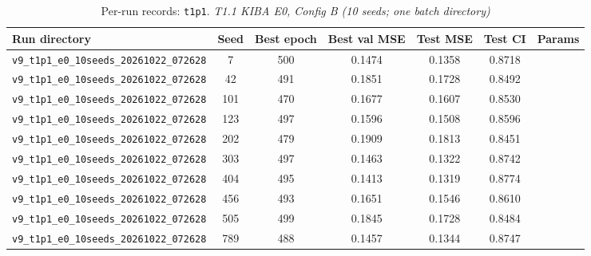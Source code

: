 \begin{table}[!h]
\centering\scriptsize
\caption{Per-run records: \texttt{t1p1}. \textit{T1.1 KIBA E0, Config B (10 seeds; one batch directory)}}
\label{tab:v9_runs_t1p1}
\begin{tabular}{p{4.8cm}cccccc}
\toprule
Run directory & Seed & Best epoch & Best val MSE & Test MSE & Test CI & Params \\
\midrule
\texttt{v9\_\allowbreak{}t1p1\_\allowbreak{}e0\_\allowbreak{}10seeds\_\allowbreak{}20261022\_\allowbreak{}072628} & 7 & 500 & 0.1474 & 0.1358 & 0.8718 &  \\
\texttt{v9\_\allowbreak{}t1p1\_\allowbreak{}e0\_\allowbreak{}10seeds\_\allowbreak{}20261022\_\allowbreak{}072628} & 42 & 491 & 0.1851 & 0.1728 & 0.8492 &  \\
\texttt{v9\_\allowbreak{}t1p1\_\allowbreak{}e0\_\allowbreak{}10seeds\_\allowbreak{}20261022\_\allowbreak{}072628} & 101 & 470 & 0.1677 & 0.1607 & 0.8530 &  \\
\texttt{v9\_\allowbreak{}t1p1\_\allowbreak{}e0\_\allowbreak{}10seeds\_\allowbreak{}20261022\_\allowbreak{}072628} & 123 & 497 & 0.1596 & 0.1508 & 0.8596 &  \\
\texttt{v9\_\allowbreak{}t1p1\_\allowbreak{}e0\_\allowbreak{}10seeds\_\allowbreak{}20261022\_\allowbreak{}072628} & 202 & 479 & 0.1909 & 0.1813 & 0.8451 &  \\
\texttt{v9\_\allowbreak{}t1p1\_\allowbreak{}e0\_\allowbreak{}10seeds\_\allowbreak{}20261022\_\allowbreak{}072628} & 303 & 497 & 0.1463 & 0.1322 & 0.8742 &  \\
\texttt{v9\_\allowbreak{}t1p1\_\allowbreak{}e0\_\allowbreak{}10seeds\_\allowbreak{}20261022\_\allowbreak{}072628} & 404 & 495 & 0.1413 & 0.1319 & 0.8774 &  \\
\texttt{v9\_\allowbreak{}t1p1\_\allowbreak{}e0\_\allowbreak{}10seeds\_\allowbreak{}20261022\_\allowbreak{}072628} & 456 & 493 & 0.1651 & 0.1546 & 0.8610 &  \\
\texttt{v9\_\allowbreak{}t1p1\_\allowbreak{}e0\_\allowbreak{}10seeds\_\allowbreak{}20261022\_\allowbreak{}072628} & 505 & 499 & 0.1845 & 0.1728 & 0.8484 &  \\
\texttt{v9\_\allowbreak{}t1p1\_\allowbreak{}e0\_\allowbreak{}10seeds\_\allowbreak{}20261022\_\allowbreak{}072628} & 789 & 488 & 0.1457 & 0.1344 & 0.8747 &  \\
\bottomrule
\end{tabular}
\end{table}

